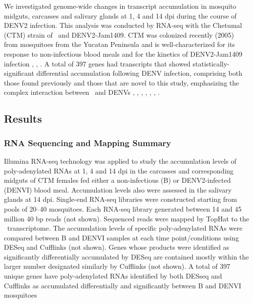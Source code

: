 We investigated genome-wide changes in transcript accumulation in mosquito midguts, carcasses and salivary glands at 1, 4 and 14 \gls{dpi} during the course of \gls{DENV}2 infection.
This analysis was conducted by RNA-seq with the Chetumal (CTM) strain of \Aa\ and \gls{DENV}2-Jam1409.
CTM was colonized recently (2005) from mosquitoes from the Yucatan Peninsula and is well-characterized for its response to non-infectious blood meals and for the kinetics of \gls{DENV}2-Jam1409 infection \cite{Salazar2007}, \cite{Bernhardt2012}, \cite{bonizzoni2012strain}.
A total of 397 genes had transcripts that showed statistically-significant differential accumulation following \gls{DENV} infection, comprising both those found previously and those that are novel to this study, emphasizing the complex interaction between \Aa\ and \gls{DENV}s \cite{Xi2008}, \cite{Sim2010}, \cite{Tchankouo-Nguetcheu2010}, \cite{Luplertlop2011}, \cite{Behura2011}, \cite{Sim2012}, \cite{Colpitts2011}.




\subsection{Results}
\subsubsection{RNA Sequencing and Mapping Summary}

Illumina RNA-seq technology was applied to study the accumulation levels of poly-adenylated RNAs at 1, 4 and 14 \gls{dpi} in the carcasses and corresponding midguts of CTM females fed either a non-infectious (B) or \gls{DENV}2-infected (\gls{DENVI}) blood meal.
Accumulation levels also were assessed in the salivary glands at 14 \gls{dpi}.
Single-end RNA-seq libraries were constructed starting from pools of 20–40 mosquitoes.
Each RNA-seq library generated between 14 and 45 million 40 bp reads (not shown).
Sequenced reads were mapped by TopHat \cite{Trapnell2009} to the \Aa\ transcriptome.
The accumulation levels of specific poly-adenylated RNAs were compared between B and \gls{DENVI} samples at each time point/conditions using DESeq \cite{Anders2010} and Cufflinks \cite{Trapnell2010} (not shown).
Genes whose products were identified as significantly differentially accumulated by DESeq are contained mostly within the larger number designated similarly by Cufflinks (not shown). A total of 397 unique genes have poly-adenylated RNAs identified by both DESseq and Cufflinks as accumulated differentially and significantly between B and \gls{DENVI} mosquitoes

